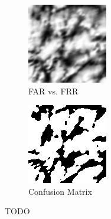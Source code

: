 \begin{enumerate}
    \begin{figure}[!ht]
        \centering
        \begin{subfigure}[t]{0.48\columnwidth}
            \includegraphics[width=\textwidth]{./images/preprocessing/enhanced_image.png}
            \caption{FAR vs. FRR}
            \label{fig:far_vs_frr}
        \end{subfigure}
        \hfill
        \begin{subfigure}[t]{0.48\columnwidth}
            \includegraphics[width=\textwidth]{./images/preprocessing/binarize_image.png}
            \caption{Confusion Matrix}
            \label{fig:confusion_matrix}
        \end{subfigure}
        \caption{TODO}
        \label{fig:far_frr_confusion}
    \end{figure}


\end{enumerate}
